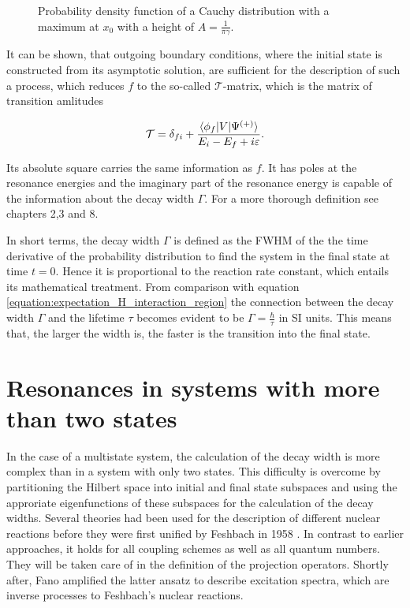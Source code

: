 \begin{figure}[h]
  \centering
  
  \caption{Probability density function of a Cauchy distribution with a
           maximum at $x_0$ with a height of $A=\frac{1}{\pi\gamma}$.}
  \label{figure:general_resonance}
\end{figure}

It can be shown, that outgoing boundary conditions, where the initial state is
constructed from its asymptotic solution, are sufficient for the
description of such a process, which reduces $f$ to the so-called $\mathcal{T}$-matrix,
which is the matrix of transition amlitudes

\begin{equation}
  \mathcal{T} = \delta_{fi} + \frac{\braket{\phi_f|V|\Psi^{(+)}}}{E_i-E_f+i\varepsilon} .
\end{equation}

Its absolute square carries the same information
as $f$. It has poles at the resonance energies and the imaginary part of
the resonance energy is capable of the information about the decay width $\Gamma$.
For a more thorough definition see \cite{Taylor87} chapters 2,3 and 8.

In short terms, the decay width $\Gamma$ is defined as the FWHM of the
the time derivative of the probability distribution to find the system in
the final state at time $t=0$. Hence it is proportional to the reaction rate
constant, which entails its mathematical treatment. 
From comparison with equation \ref{equation:expectation_H_interaction_region}
the connection between the decay width $\Gamma$ and the lifetime $\tau$ becomes
evident to be
$\Gamma=\frac \hbar \tau$ in SI units.
This means that, the larger the width is, the faster is the transition
into the final state.


\section{Resonances in systems with more than two states}

In the case of a multistate system, the calculation of the decay width is more
complex than in a system with only two states.
This difficulty is overcome by partitioning the Hilbert space into initial and final
state subspaces and using the approriate eigenfunctions of these subspaces for the
calculation of the decay widths. 
Several theories had been used for the description of different nuclear reactions
before they were first unified by Feshbach in 1958 \cite{Feshbach58,Feshbach62,Feshbach_book}.
In contrast to earlier approaches, it holds for all coupling schemes as well as
all quantum numbers. They will be taken care of in the definition of the
projection operators.
Shortly after,
Fano amplified the latter ansatz to describe excitation spectra, which
are inverse processes to Feshbach's nuclear reactions.\cite{Fano61}



